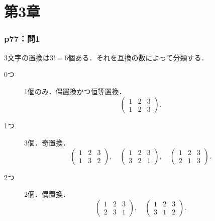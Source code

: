 
\part*{第3章}


\section*{p77：問1}


\begin{tanswer}
  3文字の置換は$3!=6$個ある．それを互換の数によって分類する．
  \begin{description}
    \item[0つ] 1個のみ．偶置換かつ恒等置換．
          \[
            \begin{pmatrix} 1 & 2 & 3 \\ 1 & 2 & 3 \end{pmatrix}.
          \]
    \item [1つ] 3個．奇置換．
          \[
            \begin{pmatrix} 1 & 2 & 3\\ 1 & 3 & 2 \end{pmatrix},\quad
            \begin{pmatrix} 1 & 2 & 3\\ 3 & 2 & 1 \end{pmatrix},\quad
            \begin{pmatrix} 1 & 2 & 3\\ 2 & 1 & 3 \end{pmatrix}.
          \]
    \item [2つ] 2個．偶置換．
          \[
            \begin{pmatrix} 1 & 2 & 3\\ 2 & 3 & 1 \end{pmatrix},\quad
            \begin{pmatrix} 1 & 2 & 3\\ 3 & 1 & 2 \end{pmatrix}.
          \]
  \end{description}
\end{tanswer}


